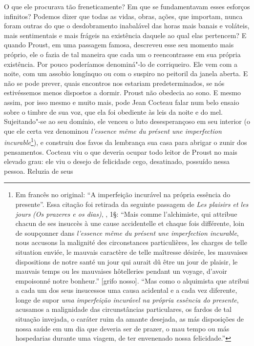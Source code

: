 O que ele procurava tão freneticamente? Em que se fundamentavam esses
esforços infinitos? Podemos dizer que todas as vidas, obras, ações, que
importam, nunca foram outras do que o desdobramento inabalável das horas
mais banais e voláteis, mais sentimentais e mais frágeis na existência
daquele ao qual elas pertencem? E quando Proust, em uma passagem famosa,
descreveu esse seu momento mais próprio, ele o fazia de tal maneira que
cada um o reencontrasse em sua própria existência. Por pouco poderíamos
denominá"-lo de corriqueiro. Ele vem com a noite, com um assobio
longínquo ou com o suspiro no peitoril da janela aberta. E não se pode
prever, quais encontros nos estariam predeterminados, se nós
estivéssemos menos dispostos a dormir. Proust não obedecia ao sono. E
mesmo assim, por isso mesmo e muito mais, pode Jean Cocteau falar num
belo ensaio sobre o timbre de sua voz, que ela foi obediente às leis da
noite e do mel. Sujeitando"-se ao seu domínio, ele venceu o luto
desesperançoso em seu interior (o que ele certa vez denominou
\emph{l'essence même du présent une imperfection incurable}\footnote{Em francês no original: ``A imperfeição incurável na própria essência
  do presente''. Essa citação foi retirada da seguinte passagem de
  \emph{Les plaisirs et les jours} \emph{(Os prazeres e os dias)}, ,
  1§: ``Mais comme l'alchimiste, qui attribue chacun de ses insuccès à
  une cause accidentelle et chaque fois différente, loin de soupçonner
  dans \emph{l'essence même du présent une imperfection incurable}, nous
  accusons la malignité des circonstances particulières, les charges de
  telle situation enviée, le mauvais caractère de telle maîtresse
  désirée, les mauvaises dispositions de notre santé un jour qui aurait
  dû être un jour de plaisir, le mauvais temps ou les mauvaises
  hôtelleries pendant un voyage, d'avoir empoisonné notre bonheur.''
  {[}grifo nosso{]}. ``Mas como o alquimista que atribui a cada um dos
  seus insucessos uma causa acidental e a cada vez diferente, longe de
  supor \emph{uma imperfeição incurável na própria essência do
  presente}, acusamos a malignidade das circunstâncias particulares, os
  fardos de tal situação invejada, o caráter ruim da amante desejada, as
  más disposições de nossa saúde em um dia que deveria ser de prazer, o
  mau tempo ou más hospedarias durante uma viagem, de ter envenenado
  nossa felicidade.'' \versal{[N.~T.]}}), e construiu dos favos da lembrança sua casa
para abrigar o zunir dos pensamentos. Cocteau viu o que deveria ocupar
todo leitor de Proust no mais elevado grau: ele viu o desejo de
felicidade cego, desatinado, possuído nessa pessoa. Reluzia de seus
